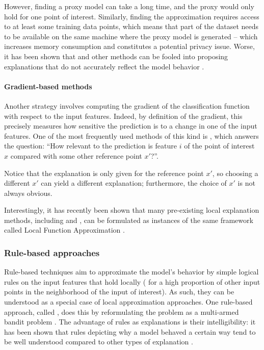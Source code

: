 \documentclass[../main.tex]{subfiles}
\begin{document}
However, finding a proxy model can take a long time, and the proxy would only hold for one point of interest.
Similarly, finding the approximation requires access to at least some training data points, which means that part of the dataset needs to be available on the same machine where the proxy model is generated -- which increases memory consumption and constitutes a potential privacy issue.
Worse, it has been shown that  and other methods can be fooled into proposing explanations that do not accurately reflect the model behavior \cite{slackFooling2020}.

\paragraph{Gradient-based methods}

Another strategy involves computing the gradient of the classification function with respect to the input features. Indeed, by definition of the gradient, this precisely measures how sensitive the prediction is to a change in one of the input features.
One of the most frequently used methods of this kind is  \cite{sundararajanAxiomatic2017}, which answers the question: ``How relevant to the prediction is feature $i$ of the point of interest $x$ compared with some other reference point $x'$?''.

Notice that the explanation is only given for the reference point $x'$, so choosing a different $x'$ can yield a different explanation; furthermore, the choice of $x'$ is not always obvious.

Interestingly, it has recently been shown that many pre-existing local explanation methods, including  and , can be formulated as instances of the same framework called Local Function Approximation \cite{hanWhich2022}.

\subsubsection{Rule-based approaches}

Rule-based techniques aim to approximate the model's behavior by simple logical rules on the input features that hold locally (\ie{} for a high proportion of other input points in the neighborhood of the input of interest).
As such, they can be understood as a special case of local approximation approaches.
One rule-based approach, called , does this by reformulating the problem as a multi-armed bandit problem \cite{ribeiroAnchors2018}.
The advantage of rules as explanations is their intelligibility: it has been shown that rules depicting why a model behaved a certain way tend to be well understood compared to other types of explanation \cite{limWhy2009}.
\end{document}
